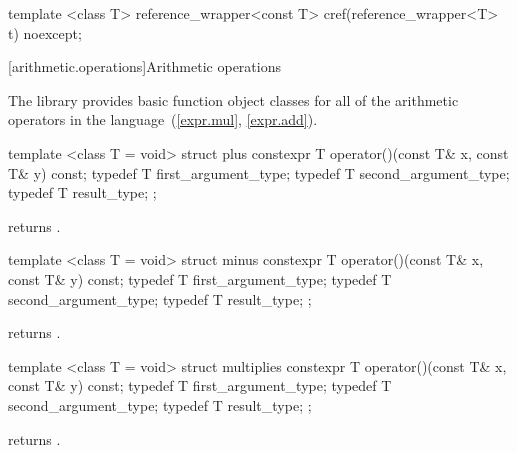 \begin{itemdescr}
\pnum\returns {}
\end{itemdescr}

%
%
\begin{itemdecl}
template <class T> reference_wrapper<const T> cref(reference_wrapper<T> t) noexcept;
\end{itemdecl}

\begin{itemdescr}
\pnum\returns {}
\end{itemdescr}

[arithmetic.operations]{Arithmetic operations}

\pnum
The library provides basic function object classes for all of the arithmetic
operators in the language~(\ref{expr.mul}, \ref{expr.add}).

%
\begin{itemdecl}
template <class T = void> struct plus {
  constexpr T operator()(const T& x, const T& y) const;
  typedef T first_argument_type;
  typedef T second_argument_type;
  typedef T result_type;
};
\end{itemdecl}

\begin{itemdescr}
\pnum
{}
returns
.
\end{itemdescr}

%
\begin{itemdecl}
template <class T = void> struct minus {
  constexpr T operator()(const T& x, const T& y) const;
  typedef T first_argument_type;
  typedef T second_argument_type;
  typedef T result_type;
};
\end{itemdecl}

\begin{itemdescr}
\pnum
{}
returns
.
\end{itemdescr}

%
\begin{itemdecl}
template <class T = void> struct multiplies {
  constexpr T operator()(const T& x, const T& y) const;
  typedef T first_argument_type;
  typedef T second_argument_type;
  typedef T result_type;
};
\end{itemdecl}

\begin{itemdescr}
\pnum
{}
returns
.
\end{itemdescr}

